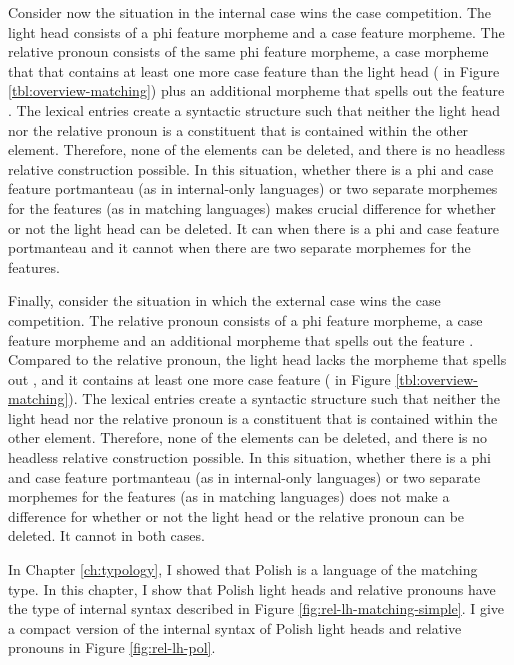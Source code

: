 Consider now the situation in the internal case wins the case competition. The light head consists of a phi feature morpheme and a case feature morpheme. The relative pronoun consists of the same phi feature morpheme, a case morpheme that that contains at least one more case feature than the light head ( in Figure \ref{tbl:overview-matching}) plus an additional morpheme that spells out the feature . The lexical entries create a syntactic structure such that neither the light head nor the relative pronoun is a constituent that is contained within the other element. Therefore, none of the elements can be deleted, and there is no headless relative construction possible.
In this situation, whether there is a phi and case feature portmanteau (as in internal-only languages) or two separate morphemes for the features (as in matching languages) makes crucial difference for whether or not the light head can be deleted. It can when there is a phi and case feature portmanteau and it cannot when there are two separate morphemes for the features.

Finally, consider the situation in which the external case wins the case competition. The relative pronoun consists of a phi feature morpheme, a case feature morpheme and an additional morpheme that spells out the feature . Compared to the relative pronoun, the light head lacks the morpheme that spells out , and it contains at least one more case feature ( in Figure \ref{tbl:overview-matching}). The lexical entries create a syntactic structure such that neither the light head nor the relative pronoun is a constituent that is contained within the other element. Therefore, none of the elements can be deleted, and there is no headless relative construction possible.
In this situation, whether there is a phi and case feature portmanteau (as in internal-only languages) or two separate morphemes for the features (as in matching languages) does not make a difference for whether or not the light head or the relative pronoun can be deleted. It cannot in both cases.

In Chapter \ref{ch:typology}, I showed that Polish is a language of the matching type. In this chapter, I show that Polish light heads and relative pronouns have the type of internal syntax described in Figure \ref{fig:rel-lh-matching-simple}. I give a compact version of the internal syntax of Polish light heads and relative pronouns in Figure \ref{fig:rel-lh-pol}.

